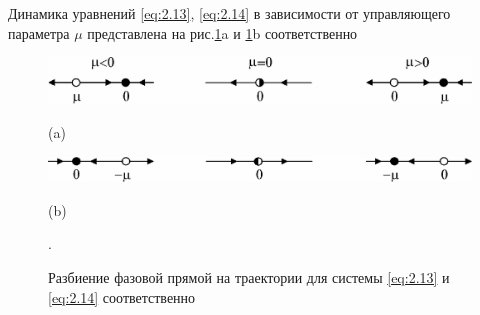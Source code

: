 Динамика уравнений \eqref{eq:2.13}, \eqref{eq:2.14} в зависимости от управляющего параметра $\mu$ представлена на рис.\ref{fig:2.7}a и \ref{fig:2.7}b соответственно

\begin{figure}[h!]
	\centering
	\begin{minipage}{0.49\linewidth}
		\centering
		\includegraphics[]{fig/lect2/7a}

		(a)
		\label{fig:2_7a}
	\end{minipage}
	\vfill
	\begin{minipage}{0.49\linewidth}
		\centering
        \includegraphics[]{fig/lect2/7b}

		(b)
		\label{fig:2_7b}
	\end{minipage}
	\caption{Разбиение фазовой прямой на траектории для системы \eqref{eq:2.13} и \eqref{eq:2.14} соответственно}.
	\label{fig:2.7}
\end{figure}

